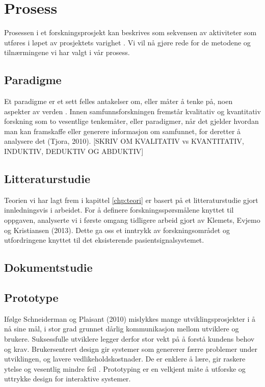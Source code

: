 \section{Prosess}
\label{chp: prosess}

Prosessen i et forskningsprosjekt kan beskrives som sekvensen av aktiviteter som utføres i løpet av prosjektets varighet \cite{Oates}. Vi vil nå gjøre rede for de metodene og tilnærmingene vi har valgt i vår prosess.

\subsection{Paradigme}
Et paradigme er et sett felles antakelser om, eller måter å tenke på, noen aspekter av verden \cite{Oates}. Innen samfunnsforskningen fremstår kvalitativ og kvantitativ forskning som to vesentlige tenkemåter, eller paradigmer, når det gjelder hvordan man kan framskaffe eller generere informasjon om samfunnet, for deretter å analysere det (Tjora, 2010).
[SKRIV OM KVALITATIV vs KVANTITATIV, INDUKTIV, DEDUKTIV OG ABDUKTIV]

\subsection{Litteraturstudie}
Teorien vi har lagt frem i kapittel \ref{chp:teori} er basert på et litteraturstudie gjort innledningsvis i arbeidet. For å definere forskningsspørsmålene knyttet til oppgaven, analyserte vi i første omgang tidligere arbeid gjort av Klemets, Evjemo og Kristiansen (2013). Dette ga oss et inntrykk av forskningsområdet og utfordringene knyttet til det eksisterende pasientsignalsystemet. 

\subsection{Dokumentstudie}

\subsection{Prototype}
Ifølge Schneiderman og Plaisant (2010) mislykkes mange utviklingsprosjekter i å nå sine mål, i stor grad grunnet dårlig kommunikasjon mellom utviklere og brukere. Suksessfulle utviklere legger derfor stor vekt på å forstå kundens behov og krav. 
Brukersentrert design gir systemer som genererer færre problemer under utviklingen, og lavere vedlikeholdskostnader. De er enklere å lære, gir raskere ytelse og vesentlig mindre feil \cite{mmi}.
Prototyping er en velkjent måte å utforske og uttrykke design for interaktive systemer. 

